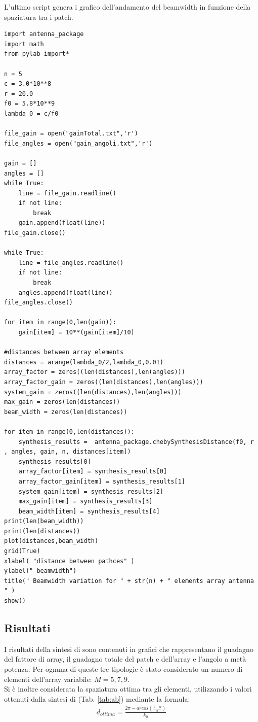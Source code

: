 L'ultimo script genera i grafico dell'andamento del beamwidth in funzione della spaziatura tra i patch.
\begin{verbatim}
import antenna_package
import math
from pylab import*

n = 5
c = 3.0*10**8
r = 20.0
f0 = 5.8*10**9
lambda_0 = c/f0

file_gain = open("gainTotal.txt",'r')
file_angles = open("gain_angoli.txt",'r')

gain = []
angles = []
while True:
    line = file_gain.readline()
    if not line:
        break
    gain.append(float(line))
file_gain.close()

while True:
    line = file_angles.readline()
    if not line:
        break
    angles.append(float(line))
file_angles.close()

for item in range(0,len(gain)):
    gain[item] = 10**(gain[item]/10)

#distances between array elements
distances = arange(lambda_0/2,lambda_0,0.01)
array_factor = zeros((len(distances),len(angles)))
array_factor_gain = zeros((len(distances),len(angles)))
system_gain = zeros((len(distances),len(angles)))
max_gain = zeros(len(distances))
beam_width = zeros(len(distances))

for item in range(0,len(distances)):
    synthesis_results =  antenna_package.chebySynthesisDistance(f0, r , angles, gain, n, distances[item])
    synthesis_results[0]
    array_factor[item] = synthesis_results[0]
    array_factor_gain[item] = synthesis_results[1]
    system_gain[item] = synthesis_results[2]
    max_gain[item] = synthesis_results[3]
    beam_width[item] = synthesis_results[4]
print(len(beam_width))
print(len(distances))
plot(distances,beam_width)
grid(True)
xlabel( "distance between pathces" )
ylabel(" beamwidth")
title(" Beamwidth variation for " + str(n) + " elements array antenna " )
show()
\end{verbatim}

\subsection{Risultati}
I risultati della sintesi di \cheby sono contenuti in grafici che rappresentano il guadagno del fattore di array, il guadagno totale del patch e dell'array e l'angolo a metà potenza. Per ognuna di queste tre tipologie è stato considerato un numero di elementi dell'array variabile: $M = 5, 7, 9 $. \\
Si è inoltre considerata la spaziatura ottima tra gli elementi, utilizzando i valori ottenuti dalla sintesi di \cheby (Tab. \ref{tab:ab}) mediante la formula:
\begin{align}
\label{eq:d}
d_{ottima} = \frac{2 \pi - arcos(\frac{1-a}{b})}{k_0}
\end{align}

